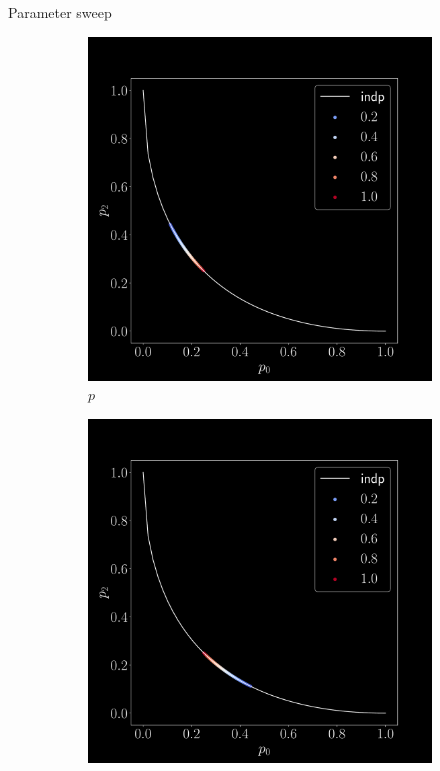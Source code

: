 \documentclass[aspectratio=169,9pt]{beamer}
\begin{document}
\begin{frame}{Parameter sweep}
  \begin{figure}[h]
    \begin{adjustwidth}{-7cm}{-7cm}
      \centering
      \begin{subfigure}[b]{0.2\textwidth}
        \centering
        \includegraphics[width=\textwidth]{sweep-p}
        \caption{$p$}
      \end{subfigure}\pause
      \begin{subfigure}[b]{0.2\textwidth}
        \centering
        \includegraphics[width=\textwidth]{sweep-q}

\end{subfigure}
\end{adjustwidth}
\end{figure}
\end{frame}
\end{document}
